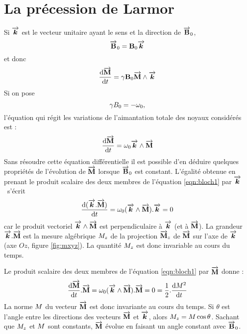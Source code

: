 \section{La précession de Larmor}
\label{sec:larmor}
Si $\overrightarrow{\boldsymbol{k}}$ est le vecteur unitaire ayant le sens
et la direction de $\overrightarrow{\mathbf{B}}_0$,
\begin{equation}
\overrightarrow{\mathbf{B}}_0 = \mathbf{B}_0 \overrightarrow{\boldsymbol{k}}
\end{equation}
et donc
\begin{equation}
\frac{\mbox{d}\overrightarrow{\mathbf{M}}}{\mbox{d} t} = \gamma \mathbf{B}_0 \overrightarrow{\mathbf{M}} \wedge \overrightarrow{\boldsymbol{k}}
\end{equation}
Si on pose
\begin{equation}
\gamma B_0 = -\omega_0,
\end{equation}
l'équation qui régit les variations de l'aimantation totale des
noyaux considérés est :
\begin{equation}
\label{eqn:bloch1}
\derivt{\aimvec} = \omega_0 \kvec \wedge \aimvec
\end{equation}
Sans résoudre cette équation différentielle il est possible d'en déduire quelques
propriétés de l'évolution de $\overrightarrow{\mathbf{M}}$
lorsque $\overrightarrow{\mathbf{B}}_0$ est constant.
L'égalité obtenue en prenant le produit scalaire des deux membres de
l'équation \ref{eqn:bloch1} par $\overrightarrow{\boldsymbol{k}}$\ s'écrit
\begin{equation}
\frac{\mbox{d}(\overrightarrow{\boldsymbol{k}}.\overrightarrow{\mathbf{M}})}{\mbox{d} t} = \omega_0 (\overrightarrow{\boldsymbol{k}} \wedge \overrightarrow{\mathbf{M}}).\overrightarrow{\boldsymbol{k}} = 0
\end{equation}
car le produit vectoriel $\overrightarrow{\boldsymbol{k}} \wedge \overrightarrow{\mathbf{M}}$
est perpendiculaire à $\overrightarrow{\boldsymbol{k}}$
(et à $\overrightarrow{\mathbf{M}}$).
La grandeur $\overrightarrow{\boldsymbol{k}}.\overrightarrow{\mathbf{M}}$ est la
mesure algébrique $M_z$ de la projection $\overrightarrow{\mathbf{M}}_z$
de $\overrightarrow{\mathbf{M}}$ sur l'axe de $\overrightarrow{\boldsymbol{k}}$ (axe $Oz$, figure \ref{fig:mxyz}).
La quantité $M_z$ est donc invariable au cours du temps.

Le produit scalaire des deux membres de l'équation \ref{eqn:bloch1}
par $\overrightarrow{\mathbf{M}}$ donne :
\begin{equation}
\label{eqn:normcnste}
\derivt{\aimvec}.\aimvec = 
\omega_0 (\kvec \wedge \aimvec).\aimvec = 0
= \frac{1}{2}.\derivt{\aims^2}
\end{equation}
La norme $M$ du vecteur $\overrightarrow{\mathbf{M}}$ est donc invariante au cours du temps.
Si $\theta$ est l'angle entre les directions des vecteurs
$\overrightarrow{\mathbf{M}}$ et $\overrightarrow{\boldsymbol{k}}$,
alors $M_z = M\cos\theta$.
Sachant que $M_z$ et $M$ sont constants,
$\overrightarrow{\mathbf{M}}$ évolue en
faisant un angle constant avec $\overrightarrow{\mathbf{B}}_0$.

